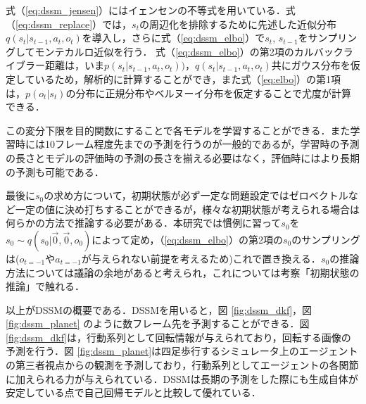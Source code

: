 式（\ref{eq:dssm_jensen}）にはイェンセンの不等式を用いている．式（\ref{eq:dssm_replace}）では，$s_t$の周辺化を排除するために先述した近似分布$q(s_t|s_{t-1}, a_t, o_t)$を導入し，さらに式（\ref{eq:dssm_elbo}）で$s_t$, $s_{t-1}$をサンプリングしてモンテカルロ近似を行う．
式（\ref{eq:dssm_elbo}）の第2項のカルバックライブラー距離は，いま$p(s_t|s_{t-1}, a_t, o_t))$，$q(s_t|s_{t-1}, a_t, o_t)$共にガウス分布を仮定しているため，解析的に計算することができ，また式（\ref{eq:elbo}）の第1項は，$p(o_t|s_t)$の分布に正規分布やベルヌーイ分布を仮定することで尤度が計算できる．

この変分下限を目的関数にすることで各モデルを学習することができる．また学習時には10フレーム程度先までの予測を行うのが一般的であるが，学習時の予測の長さとモデルの評価時の予測の長さを揃える必要はなく，評価時にはより長期の予測も可能である．

最後に$s_0$の求め方について，初期状態が必ず一定な問題設定ではゼロベクトルなど一定の値に決め打ちすることができるが，様々な初期状態が考えられる場合は何らかの方法で推論する必要がある．本研究では慣例に習って$s_0$を$s_0 \sim q(s_0|\vec{0}, \vec{0}, o_0) $によって定め，（\ref{eq:dssm_elbo}）の第2項の$s_0$のサンプリングは($o_{t=-1}$や$a_{t=-1}$が与えられない前提を考えるため)これで置き換える．$s_0$の推論方法については議論の余地があると考えられ，これについては考察「初期状態の推論」で触れる．

\vspace{\baselineskip}
以上がDSSMの概要である．DSSMを用いると，図 \ref{fig:dssm_dkf}，図 \ref{fig:dssm_planet} のように数フレーム先を予測することができる．図 \ref{fig:dssm_dkf}は，行動系列として回転情報が与えられており，回転する画像の予測を行う．図 \ref{fig:dssm_planet}は四足歩行するシミュレータ上のエージェントの第三者視点からの観測を予測しており，行動系列としてエージェントの各関節に加えられる力が与えられている．DSSMは長期の予測をした際にも生成自体が安定している点で自己回帰モデルと比較して優れている．

